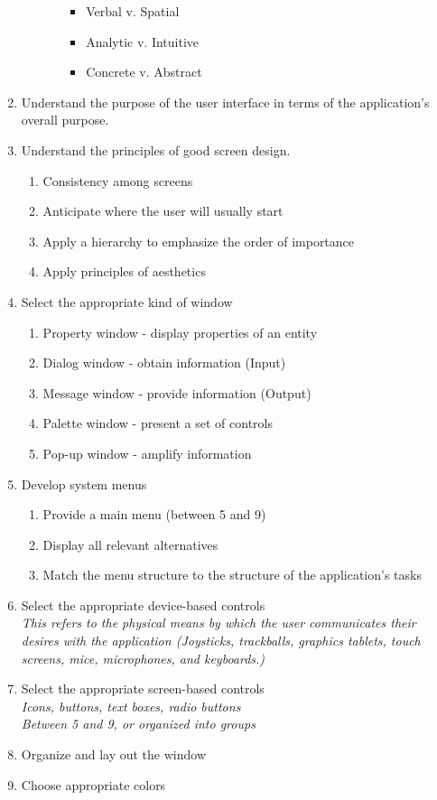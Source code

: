 \documentclass{report}
\begin{document}
\begin{enumerate}
\begin{enumerate}
\begin{enumerate}
										\begin{itemize}
											\item Verbal v. Spatial
											\item Analytic v. Intuitive
											\item Concrete v. Abstract
										\end{itemize}
								\end{enumerate}
						\end{enumerate}
					\item Understand the purpose of the user interface in terms of the application's overall purpose.
					\item Understand the principles of good screen design.
						\begin{enumerate}
							\item Consistency among screens
							\item Anticipate where the user will usually start
							\item Apply a hierarchy to emphasize the order of importance
							\item Apply principles of aesthetics
						\end{enumerate}
					\item Select the appropriate kind of window
						\begin{enumerate}
							\item Property window - display properties of an entity
							\item Dialog window - obtain information (Input)
							\item Message window - provide information (Output)
							\item Palette window - present a set of controls
							\item Pop-up window - amplify information
						\end{enumerate}
					\item Develop system menus
						\begin{enumerate}
							\item Provide a main menu (between 5 and 9)
							\item Display all relevant alternatives
							\item Match the menu structure to the structure of the application's tasks
						\end{enumerate}
					\item Select the appropriate device-based controls\\
						\textit{This refers to the physical means by which the user communicates their desires with the application (Joysticks, trackballs, graphics tablets, touch screens, mice, microphones, and keyboards.)}
					\item Select the appropriate screen-based controls\\
						\textit{Icons, buttons, text boxes, radio buttons\\
								Between 5 and 9, or organized into groups}
					\item Organize and lay out the window
					\item Choose appropriate colors
				\end{enumerate}
\end{document}
